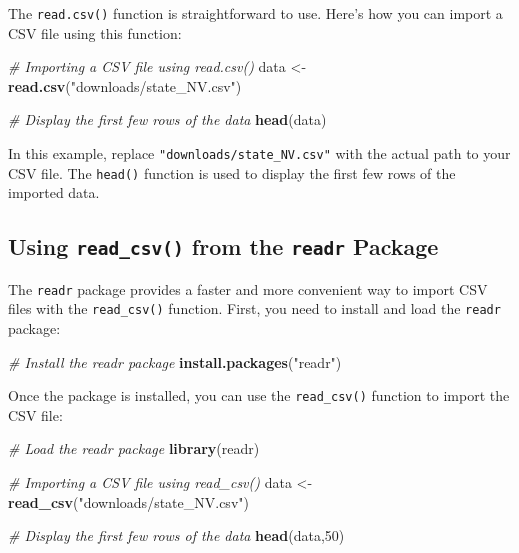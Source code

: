 \documentclass[
]{book}
\newenvironment{Shaded}{\begin{snugshade}}{\end{snugshade}}
\newcommand{\CommentTok}[1]{\textcolor[rgb]{0.56,0.35,0.01}{\textit{#1}}}
\newcommand{\DecValTok}[1]{\textcolor[rgb]{0.00,0.00,0.81}{#1}}
\newcommand{\FunctionTok}[1]{\textcolor[rgb]{0.13,0.29,0.53}{\textbf{#1}}}
\newcommand{\NormalTok}[1]{#1}
\newcommand{\OtherTok}[1]{\textcolor[rgb]{0.56,0.35,0.01}{#1}}
\newcommand{\StringTok}[1]{\textcolor[rgb]{0.31,0.60,0.02}{#1}}
\begin{document}
The \texttt{read.csv()} function is straightforward to use. Here's how you can import a CSV file using this function:

\begin{Shaded}
\begin{Highlighting}[]
\CommentTok{\# Importing a CSV file using read.csv()}
\NormalTok{data }\OtherTok{\textless{}{-}} \FunctionTok{read.csv}\NormalTok{(}\StringTok{"downloads/state\_NV.csv"}\NormalTok{)}

\CommentTok{\# Display the first few rows of the data}
\FunctionTok{head}\NormalTok{(data)}
\end{Highlighting}
\end{Shaded}

In this example, replace \texttt{"downloads/state\_NV.csv"} with the actual path to your CSV file. The \texttt{head()} function is used to display the first few rows of the imported data.

\subsection{\texorpdfstring{Using \texttt{read\_csv()} from the \texttt{readr} Package}{Using read\_csv() from the readr Package}}\label{using-read_csv-from-the-readr-package}

The \texttt{readr} package provides a faster and more convenient way to import CSV files with the \texttt{read\_csv()} function. First, you need to install and load the \texttt{readr} package:

\begin{Shaded}
\begin{Highlighting}[]
\CommentTok{\# Install the readr package}
\FunctionTok{install.packages}\NormalTok{(}\StringTok{"readr"}\NormalTok{)}
\end{Highlighting}
\end{Shaded}

Once the package is installed, you can use the \texttt{read\_csv()} function to import the CSV file:

\begin{Shaded}
\begin{Highlighting}[]
\CommentTok{\# Load the readr package}
\FunctionTok{library}\NormalTok{(readr)}

\CommentTok{\# Importing a CSV file using read\_csv()}
\NormalTok{data }\OtherTok{\textless{}{-}} \FunctionTok{read\_csv}\NormalTok{(}\StringTok{"downloads/state\_NV.csv"}\NormalTok{)}

\CommentTok{\# Display the first few rows of the data}
\FunctionTok{head}\NormalTok{(data,}\DecValTok{50}\NormalTok{)}
\end{Highlighting}
\end{Shaded}
\end{document}
